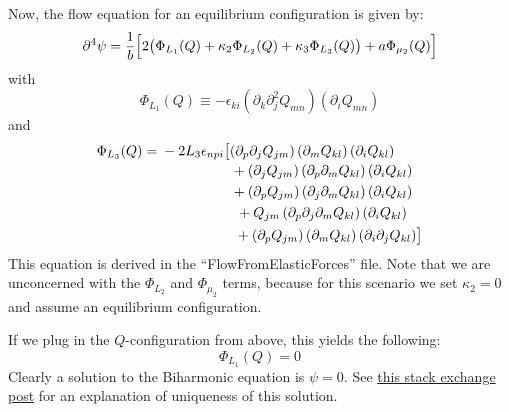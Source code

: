 \documentclass[reqno]{article}
\begin{document}
Now, the flow equation for an equilibrium configuration is given by:
\begin{equation}
	\partial^4 \psi = \frac{1}{b} \Bigl[
	2 \bigl( \Phi_{L_1} (Q) 
	+ \kappa_2 \Phi_{L_2} (Q)
	+ \kappa_3 \Phi_{L_3} (Q) \bigr)
	+ a \Phi_{\mu_2} (Q)
	\Bigr]
\end{equation}
with
\begin{equation}
	\Phi_{L_1} (Q) \equiv -\epsilon_{ki} \left( \partial_k \partial_j^2 Q_{mn} \right)
	\left( \partial_i Q_{mn} \right)
\end{equation}
and
\begin{equation}
	\Phi_{L_3}(Q)
	= 
	\begin{multlined}[t]
	-2 L_3 \epsilon_{npi} \bigl[ 
	\left( \partial_p \partial_j Q_{jm} \right) \left( \partial_m Q_{kl} \right) \left( \partial_i Q_{kl} \right) \\
	\hspace{1.5cm}+ \left( \partial_j Q_{jm} \right) \left( \partial_p \partial_m Q_{kl} \right) \left( \partial_i Q_{kl} \right) \\
	\hspace{1.5cm}+ \left( \partial_p Q_{jm} \right) \left( \partial_j \partial_m Q_{kl} \right) \left( \partial_i Q_{kl} \right) \\
	\hspace{1.5cm}+ Q_{jm} \left( \partial_p \partial_j \partial_m Q_{kl} \right) \left( \partial_i Q_{kl} \right) \\
	\hspace{1.5cm}+ \left( \partial_p Q_{jm} \right) \left( \partial_m Q_{kl} \right) \left( \partial_i \partial_j Q_{kl} \right)
	\bigr]
	\end{multlined}
\end{equation}
This equation is derived in the ``FlowFromElasticForces'' file.
Note that we are unconcerned with the $\Phi_{L_2}$ and $\Phi_{\mu_2}$ terms, because for this scenario we set $\kappa_2 = 0$ and assume an equilibrium configuration.

If we plug in the $Q$-configuration from above, this yields the following:
\begin{equation}
  \Phi_{L_1}\left(Q\right) = 0
\end{equation}
Clearly a solution to the Biharmonic equation is $\psi = 0$.
See \href{https://math.stackexchange.com/q/156366/683123}{this stack exchange post} for an explanation of uniqueness of this solution.
\end{document}
